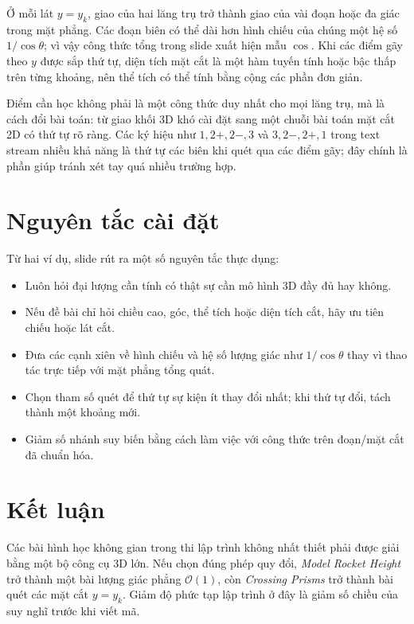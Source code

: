 \documentclass[11pt]{article}
\newcommand{\Oh}{\mathcal{O}}
\begin{document}
Ở mỗi lát \(y=y_k\), giao của hai lăng trụ trở thành giao của vài đoạn hoặc
đa giác trong mặt phẳng. Các đoạn biên có thể dài hơn hình chiếu của chúng
một hệ số \(1/\cos\theta\); vì vậy công thức tổng trong slide xuất hiện mẫu
\(\cos\). Khi các điểm gãy theo \(y\) được sắp thứ tự, diện tích mặt cắt là
một hàm tuyến tính hoặc bậc thấp trên từng khoảng, nên thể tích có thể tính
bằng cộng các phần đơn giản.

Điểm cần học không phải là một công thức duy nhất cho mọi lăng trụ, mà là cách
đổi bài toán: từ giao khối 3D khó cài đặt sang một chuỗi bài toán mặt cắt 2D
có thứ tự rõ ràng. Các ký hiệu như \(1,2+,2-,3\) và \(3,2-,2+,1\) trong text
stream nhiều khả năng là thứ tự các biên khi quét qua các điểm gãy; đây chính
là phần giúp tránh xét tay quá nhiều trường hợp.

\section{Nguyên tắc cài đặt}

Từ hai ví dụ, slide rút ra một số nguyên tắc thực dụng:
\begin{itemize}
  \item Luôn hỏi đại lượng cần tính có thật sự cần mô hình 3D đầy đủ hay không.
  \item Nếu đề bài chỉ hỏi chiều cao, góc, thể tích hoặc diện tích cắt, hãy
  ưu tiên chiếu hoặc lát cắt.
  \item Đưa các cạnh xiên về hình chiếu và hệ số lượng giác như \(1/\cos\theta\)
  thay vì thao tác trực tiếp với mặt phẳng tổng quát.
  \item Chọn tham số quét để thứ tự sự kiện ít thay đổi nhất; khi thứ tự đổi,
  tách thành một khoảng mới.
  \item Giảm số nhánh suy biến bằng cách làm việc với công thức trên đoạn/mặt
  cắt đã chuẩn hóa.
\end{itemize}

\section{Kết luận}

Các bài hình học không gian trong thi lập trình không nhất thiết phải được
giải bằng một bộ công cụ 3D lớn. Nếu chọn đúng phép quy đổi, \textit{Model
Rocket Height} trở thành một bài lượng giác phẳng \(\Oh(1)\), còn
\textit{Crossing Prisms} trở thành bài quét các mặt cắt \(y=y_k\). Giảm độ
phức tạp lập trình ở đây là giảm số chiều của suy nghĩ trước khi viết mã.
\end{document}
